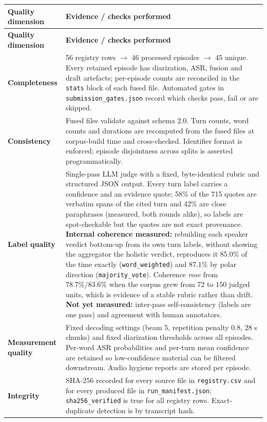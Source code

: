 \documentclass[11pt,a4paper]{article}
\newcommand{\thd}[1]{\textbf{\sffamily\small #1}}          %
\begin{document}
\begin{longtable}{|L{3.6cm}|L{11.8cm}|}
\hline
\thd{Quality dimension} & \thd{Evidence / checks performed} \\ \hline
\endfirsthead
\hline \thd{Quality dimension} & \thd{Evidence / checks performed} \\ \hline \endhead
\thd{Completeness}   & 56 registry rows $\rightarrow$ 46 processed episodes $\rightarrow$ 45 unique. Every retained episode has diarization, ASR, fusion and draft artefacts; per-episode counts are reconciled in the \texttt{stats} block of each fused file. Automated gates in \texttt{submission\_gates.json} record which checks pass, fail or are skipped. \\ \hline
\thd{Consistency}    & Fused files validate against schema 2.0. Turn counts, word counts and durations are recomputed from the fused files at corpus-build time and cross-checked. Identifier format is enforced; episode disjointness across splits is asserted programmatically. \\ \hline
\thd{Label quality}  & Single-pass LLM judge with a fixed, byte-identical rubric and structured JSON output. Every turn label carries a confidence and an evidence quote; 58\% of the 715 quotes are verbatim spans of the cited turn and 42\% are close paraphrases (measured, both rounds alike), so labels are spot-checkable but the quotes are not exact provenance. \textbf{Internal coherence measured:} rebuilding each speaker verdict bottom-up from its own turn labels, without showing the aggregator the holistic verdict, reproduces it 85.0\% of the time exactly (\texttt{word\_weighted}) and 87.1\% by polar direction (\texttt{majority\_vote}). Coherence \emph{rose} from 78.7\%/83.6\% when the corpus grew from 72 to 150 judged units, which is evidence of a stable rubric rather than drift. \textbf{Not yet measured:} inter-pass self-consistency (labels are one pass) and agreement with human annotators. \\ \hline
\thd{Measurement quality} & Fixed decoding settings (beam 5, repetition penalty 0.8, 28 s chunks) and fixed diarization thresholds across all episodes. Per-word ASR probabilities and per-turn mean confidence are retained so low-confidence material can be filtered downstream. Audio hygiene reports are stored per episode. \\ \hline
\thd{Integrity}      & SHA-256 recorded for every source file in \texttt{registry.csv} and for every produced file in \texttt{run\_manifest.json}; \texttt{sha256\_verified} is true for all registry rows. Exact-duplicate detection is by transcript hash. \\ \hline

\end{longtable}
\end{document}
